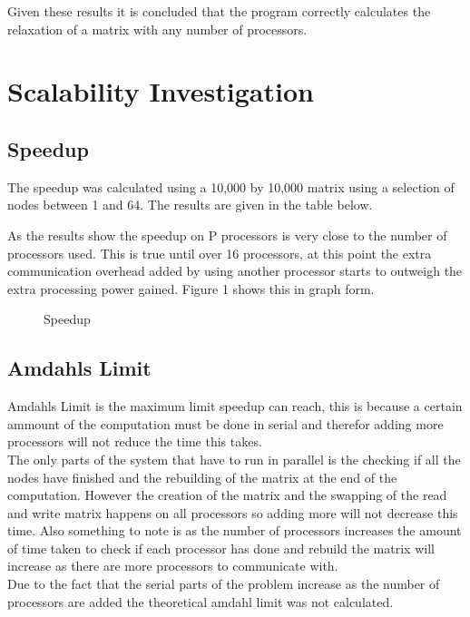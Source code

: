 \documentclass{article}
\begin{document}
Given these results it is concluded that the program correctly calculates the relaxation
of a matrix with any number of processors.

\section{Scalability Investigation}

\subsection{Speedup}

The speedup was calculated using a 10,000 by 10,000 matrix using a selection of
nodes between 1 and 64. The results are given in the table below.

\begin{center}
\end{center}

As the results show the speedup on P processors is very close to the number of processors
used. This is true until over 16 processors, at this point the extra communication
overhead added by using another processor starts to outweigh the extra processing
power gained. Figure 1 shows this in graph form.

\begin{figure}[H]
 \centering
 \caption{Speedup}
 \label{fig:speedup}
 \end{figure}

\subsection{Amdahls Limit}

Amdahls Limit is the maximum limit speedup can reach, this is because a certain ammount
of the computation must be done in serial and therefor adding more processors will not
reduce the time this takes.\\
The only parts of the system that have to run in parallel is the checking if all the
nodes have finished and the rebuilding of the matrix at the end of the computation.
However the creation of the matrix and the swapping of the read and write matrix
happens on all processors so adding more will not decrease this time. Also something
to note is as the number of processors increases the amount of time taken to check
if each processor has done and rebuild the matrix will increase as there are more
processors to communicate with.\\
Due to the fact that the serial parts of the problem increase as the number of processors
are added the theoretical amdahl limit was not calculated.
\end{document}
